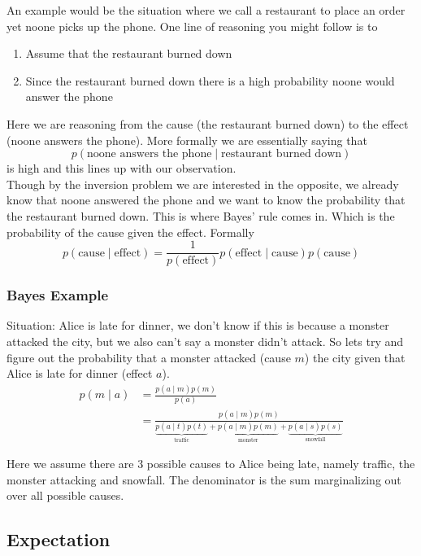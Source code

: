 \documentclass[12pt]{article}
\begin{document}
An example would be the situation where we call a restaurant to place an order yet noone picks up the phone. 
One line of reasoning you might follow is to 
\begin{enumerate}[leftmargin=*, noitemsep]
    \item Assume that the restaurant burned down 
    \item Since the restaurant burned down there is a high probability noone would answer the phone
\end{enumerate}
Here we are reasoning from the cause (the restaurant burned down) to the effect (noone answers the phone). More formally we are essentially saying that 
\[
    p(\text{noone answers the phone}\mid \text{restaurant burned down}) 
\]
is high and this lines up with our observation.\\

Though by the inversion problem we are interested in the opposite, we already know that noone answered the phone and we want to know the probability that the restaurant burned down. This is where Bayes' rule comes in. Which is the probability of the cause given the effect. Formally 
\[
    p(\text{cause} \mid \text{effect}) = \frac{1}{p(\text{effect})} p(\text{effect} \mid \text{cause}) p(\text{cause})
\]

\subsubsection*{Bayes Example}

Situation: Alice is late for dinner, we don't know if this is because a monster attacked the city, but we also can't say a monster didn't attack. So lets try and figure out the probability that a monster attacked (cause $m$) the city given that Alice is late for dinner (effect $a$).
\begin{align*}
    p(m\mid a) & = \frac{p(a\mid m)p(m)}{p(a)} \\ 
    & = \frac{p(a\mid m )p(m)}{\underbrace{p(a\mid t)p(t)}_{\text{traffic}} + \underbrace{p(a\mid m)p(m)}_{\text{monster}} + \underbrace{p(a\mid s)p(s)}_{\text{snowfall}} } 
\end{align*}

Here we assume there are 3 possible causes to Alice being late, namely traffic, the monster attacking and snowfall. The denominator is the sum marginalizing out over all possible causes.

\subsection{Expectation}
\end{document}
